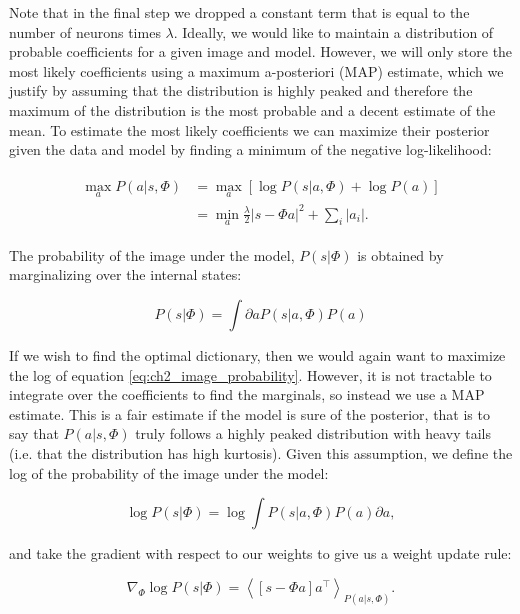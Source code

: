 Note that in the final step we dropped a constant term that is equal to the number of neurons times $\lambda$. Ideally, we would like to maintain a distribution of probable coefficients for a given image and model. However, we will only store the most likely coefficients using a maximum a-posteriori (MAP) estimate, which we justify by assuming that the distribution is highly peaked and therefore the maximum of the distribution is the most probable and a decent estimate of the mean. To estimate the most likely coefficients we can maximize their posterior given the data and model by finding a minimum of the negative log-likelihood:

\begin{align}\label{eq:ch2_min_log_likelihood}
\begin{split}
    \max_{a} P(a|s,\Phi) &= \max_{a}\left[\log{P(s|a,\Phi)} + \log{P(a)}\right] \\
                         &= \min_{a}\frac{\lambda}{2}|s - \Phi a|^{2} + \sum_{i}|a_{i}|.
\end{split}
\end{align}

The probability of the image under the model, $P(s|\Phi)$ is obtained by marginalizing over the internal states:

\begin{equation}\label{eq:ch2_image_probability}
    P(s|\Phi) = \int\partial a P(s|a,\Phi) P(a)
\end{equation}

If we wish to find the optimal dictionary, then we would again want to maximize the log of equation \eqref{eq:ch2_image_probability}. However, it is not tractable to integrate over the coefficients to find the marginals, so instead we use a MAP estimate. This is a fair estimate if the model is sure of the posterior, that is to say that $P(a|s,\Phi)$ truly follows a highly peaked distribution with heavy tails (i.e. that the distribution has high kurtosis). Given this assumption, we define the log of the probability of the image under the model:

\begin{equation}\label{eq:ch2_log_image_probability}
    \log{P(s|\Phi)} = \log{\int P(s|a,\Phi)P(a)\partial a},
\end{equation}

\noindent and take the gradient with respect to our weights to give us a weight update rule:

\begin{equation}\label{eq:ch2_probability_weight_update}
    \nabla_{\Phi} \log{P(s|\Phi)} = \left< \left[s - \Phi a\right]a^{\top}\right>_{P(a|s,\Phi)}.
\end{equation}


